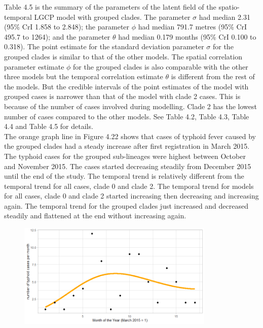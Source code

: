 \documentclass[12pt,a4paper]{report}
\begin{document}
Table 4.5 is the summary of the parameters of the latent field of the spatio-temporal LGCP model with grouped clades. The parameter $\sigma$ had median 2.31 (95\% CrI 1.858 to 2.848); the parameter $\phi$ had median 791.7 metres (95\% CrI 495.7 to 1264); and the parameter $\theta$ had median 0.179 months (95\% CrI 0.100 to 0.318). The point estimate for the standard deviation parameter $\sigma$ for the grouped clades is similar to that of the other models. The spatial correlation parameter estimate $\phi$ for the grouped clades is also comparable with the other three models but the temporal correlation estimate $\theta$ is different from the rest of the models. But the credible intervals of the point estimates of the model with grouped cases is narrower than that of the model with clade 2 cases. This is because of the number of cases involved during modelling. Clade 2 has the lowest number of cases compared to the other models. See Table 4.2, Table 4.3, Table 4.4 and Table 4.5 for details.\\

The orange graph line in Figure 4.22 shows that cases of typhoid fever caused by the grouped clades had a steady increase after first registration in March 2015. The typhoid cases for the grouped sub-lineages were highest between October and November 2015. The cases started decreasing steadily from December 2015 until the end of the study. The temporal trend is relatively different from the temporal trend for all cases, clade 0 and clade 2. The temporal trend for models for all cases, clade 0 and clade 2 started increasing then decreasing and increasing again. The temporal trend for the grouped clades just increased and decreased steadily and flattened at the end without increasing again.

\begin{figure}[H]
\begin{center}
\includegraphics[width = \linewidth, height = 50mm]{Long term trend of temporal model - Major 13456.png}
\end{center}
\end{figure}
\end{document}
